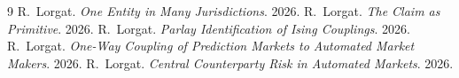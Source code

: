 \documentclass{momentum}
\begin{document}
\begin{thebibliography}{9}
 R.~Lorgat. \emph{One Entity in Many Jurisdictions}. 2026.
 R.~Lorgat. \emph{The Claim as Primitive}. 2026.
 R.~Lorgat. \emph{Parlay Identification of Ising Couplings}. 2026.
 R.~Lorgat. \emph{One-Way Coupling of Prediction Markets to Automated Market Makers}. 2026.
 R.~Lorgat. \emph{Central Counterparty Risk in Automated Markets}. 2026.
\end{thebibliography}
\end{document}
